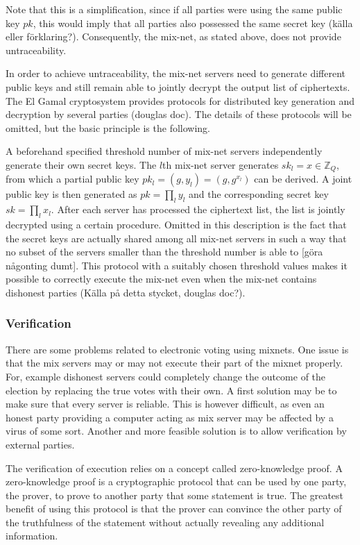 Note that this is a simplification, since if all parties were using
the same public key $pk$, this would imply that all parties also
possessed the same secret key (källa eller förklaring?). Consequently,
the mix-net, as stated above, does not provide untraceability.

In order to achieve untraceability, the mix-net servers need to
generate different public keys and still remain able to jointly
decrypt the output list of ciphertexts. The El Gamal cryptosystem
provides protocols for distributed key generation and decryption by
several parties (douglas doc). The details of these protocols will be
omitted, but the basic principle is the following.

A beforehand specified threshold number of mix-net servers
independently generate their own secret keys. The $l$th mix-net server
generates $sk_l = x \in \mathbb{Z}_Q$, from which a partial public key
$pk_l = (g,y_l) = (g,g^{x_l})$ can be derived. A joint public key is
then generated as $pk = \prod_l y_l$ and the corresponding secret key
$sk = \prod_l x_l$. After each server has processed the ciphertext
list, the list is jointly decrypted using a certain procedure. Omitted
in this description is the fact that the secret keys are actually
shared among all mix-net servers in such a way that no subset of the
servers smaller than the threshold number is able to [göra någonting
  dumt]. This protocol with a suitably chosen threshold values makes
it possible to correctly execute the mix-net even when the mix-net
contains dishonest parties (Källa på detta stycket, douglas doc?).

\subsubsection{Verification}
There are some problems related to electronic voting using
mixnets. One issue is that the mix servers may or may not execute
their part of the mixnet properly. For, example dishonest servers
could completely change the outcome of the election by replacing the
true votes with their own. A first solution may be to make sure that
every server is reliable. This is however difficult, as even an honest
party providing a computer acting as mix server may be affected by a
virus of some sort. Another and more feasible solution is to allow
verification by external parties.

The verification of execution relies on a concept called
zero-knowledge proof. A zero-knowledge proof is a cryptographic
protocol that can be used by one party, the prover, to prove to
another party that some statement is true. The greatest benefit of
using this protocol is that the prover can convince the other party of
the truthfulness of the statement without actually revealing any
additional information.

